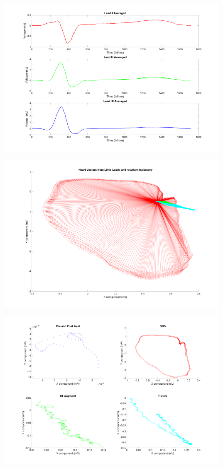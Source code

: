 \documentclass[12pt]{article}
\begin{document}
\begin{figure}[H]
	
	\centering
	\includegraphics[width = .95\textwidth]{Figures/LimLeads3.png}
	\caption{ }
	\label{fig:Limb3}
\end{figure}

\begin{figure}[H]
	
	\centering
	\includegraphics[width = .95\textwidth]{Figures/LimLeads4.png}
	\caption{ }
	\label{fig:Limb4}
\end{figure}

\begin{figure}[H]
	
	\centering
	\includegraphics[width = .95\textwidth]{Figures/LimLeads5.png}
	\caption{ }
	\label{fig:Limb5}
\end{figure}
\end{document}
